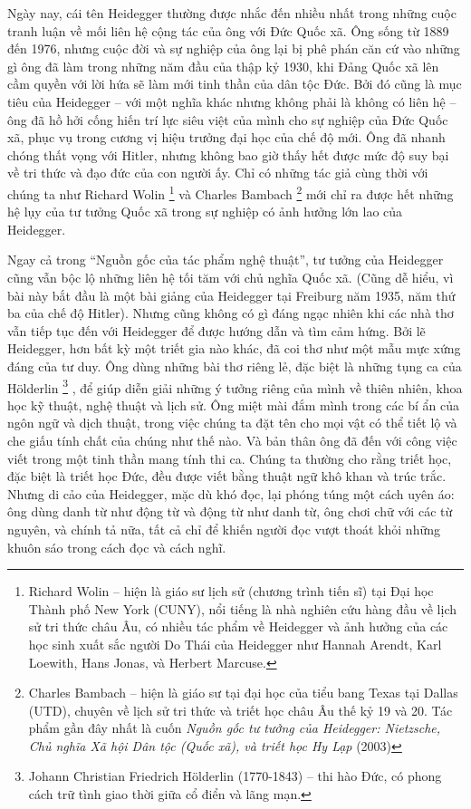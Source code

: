 \documentclass[../main.tex]{subfiles}
\begin{document}
\begin{multicols}{2}
Ngày nay, cái tên Heidegger thường được nhắc đến nhiều nhất trong những cuộc tranh luận về mối liên hệ cộng tác của ông với Đức Quốc xã. Ông sống từ 1889 đến 1976, nhưng cuộc đời và sự nghiệp của ông lại bị phê phán căn cứ vào những gì ông đã làm trong những năm đầu của thập kỷ 1930, khi Đảng Quốc xã lên cầm quyền với lời hứa sẽ làm mới tinh thần của dân tộc Đức. Bởi đó cũng là mục tiêu của Heidegger – với một nghĩa khác nhưng không phải là không có liên hệ – ông đã hồ hởi cống hiến trí lực siêu việt của mình cho sự nghiệp của Đức Quốc xã, phục vụ trong cương vị hiệu trưởng đại học của chế độ mới. Ông đã nhanh chóng thất vọng với Hitler, nhưng không bao giờ thấy hết được mức độ suy bại về tri thức và đạo đức của con người ấy. Chỉ có những tác giả cùng thời với chúng ta như Richard Wolin \footnote{
Richard Wolin – hiện là giáo sư lịch sử (chương trình tiến sĩ) tại Đại học Thành phố New York (CUNY), nổi tiếng là nhà nghiên cứu hàng đầu về lịch sử tri thức châu Âu, có nhiều tác phẩm về Heidegger và ảnh hưởng của các học sinh xuất sắc người Do Thái của Heidegger như Hannah Arendt, Karl Loewith, Hans Jonas, và Herbert Marcuse.} và Charles Bambach \footnote{
Charles Bambach – hiện là giáo sư tại đại học của tiểu bang Texas tại Dallas (UTD), chuyên về lịch sử tri thức và triết học châu Âu thế kỷ 19 và 20. Tác phẩm gần đây nhất là cuốn \textit{Nguồn gốc tư tưởng của Heidegger: Nietzsche, Chủ nghĩa Xã hội Dân tộc (Quốc xã), và triết học Hy Lạp} (2003)} mới chỉ ra được hết những hệ lụy của tư tưởng Quốc xã trong sự nghiệp có ảnh hưởng lớn lao của Heidegger. 


Ngay cả trong “Nguồn gốc của tác phẩm nghệ thuật”, tư tưởng của Heidegger cũng vẫn bộc lộ những liên hệ tối tăm với chủ nghĩa Quốc xã. (Cũng dễ hiểu, vì bài này bắt đầu là một bài giảng của Heidegger tại Freiburg năm 1935, năm thứ ba của chế độ Hitler). Nhưng cũng không có gì đáng ngạc nhiên khi các nhà thơ vẫn tiếp tục đến với Heidegger để được hướng dẫn và tìm cảm hứng. Bởi lẽ Heidegger, hơn bất kỳ một triết gia nào khác, đã coi thơ như một mẫu mực xứng đáng của tư duy. Ông dùng những bài thơ riêng lẻ, đặc biệt là những tụng ca của Hölderlin \footnote{
Johann Christian Friedrich Hölderlin (1770-1843) – thi hào Đức, có phong cách trữ tình giao thời giữa cổ điển và lãng mạn.} , để giúp diễn giải những ý tưởng riêng của mình về thiên nhiên, khoa học kỹ thuật, nghệ thuật và lịch sử. Ông miệt mài đắm mình trong các bí ẩn của ngôn ngữ và dịch thuật, trong việc chúng ta đặt tên cho mọi vật có thể tiết lộ và che giấu tính chất của chúng như thế nào. Và bản thân ông đã đến với công việc viết trong một tinh thần mang tính thi ca. Chúng ta thường cho rằng triết học, đặc biệt là triết học Đức, đều được viết bằng thuật ngữ khô khan và trúc trắc. Nhưng di cảo của Heidegger, mặc dù khó đọc, lại phóng túng một cách uyên áo: ông dùng danh từ như động từ và động từ như danh từ, ông chơi chữ với các từ nguyên, và chính tả nữa, tất cả chỉ để khiến người đọc vượt thoát khỏi những khuôn sáo trong cách đọc và cách nghĩ. 


\end{multicols}
\end{document}
